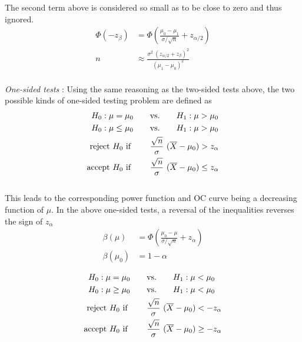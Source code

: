 The second term above is considered so small as to be close to zero and thus ignored.\\

\begin{align}
	\Phi(-z_\beta) &= \Phi\left(\frac{\mu_0 - \mu_1}{\sigma/\sqrt{n}} + z_{\alpha/2}\right) \nonumber \\
	n &\approx \frac{\sigma^2\ (z_{\alpha/2} + z_\beta)^2}{(\mu_1 - \mu_0)^2}
\end{align}\\

\textit{One-sided tests} : Using the same reasoning as the two-sided tests above, the two possible kinds of one-sided testing problem are defined as\\

\begin{align}
	H_0 : \mu = \mu_0 \qquad &\text{vs.} \qquad H_1 : \mu > \mu_0 \\
	H_0 : \mu \leq \mu_0 \qquad &\text{vs.} \qquad H_1 : \mu > \mu_0 \\
	\text{reject $ H_0 $ if } \qquad & \frac{\sqrt{n}}{\sigma}\ (\overline{X} - \mu_0)  > z_{\alpha} \\
	\text{accept $ H_0 $ if } \qquad & \frac{\sqrt{n}}{\sigma}\  (\overline{X} - \mu_0)  \leq z_{\alpha}
\end{align} \\

This leads to the corresponding power function and OC curve being a decreasing function of $ \mu $. In the above one-sided tests, a reversal of the inequalities reverses the sign of $ z_\alpha $\\

\begin{align}
	\beta(\mu) &= \Phi\left(\frac{\mu_0 - \mu}{\sigma/\sqrt{n}} + z_{\alpha}\right) \\
	\beta(\mu_0) &= 1 - \alpha
\end{align}

\begin{align}
	H_0 : \mu = \mu_0 \qquad &\text{vs.} \qquad H_1 : \mu < \mu_0 \\
	H_0 : \mu \geq \mu_0 \qquad &\text{vs.} \qquad H_1 : \mu < \mu_0 \\
	\text{reject $ H_0 $ if } \qquad & \frac{\sqrt{n}}{\sigma}\ (\overline{X} - \mu_0)  < -z_{\alpha} \\
	\text{accept $ H_0 $ if } \qquad & \frac{\sqrt{n}}{\sigma}\  (\overline{X} - \mu_0)  \geq -z_{\alpha}
\end{align} \\


\newpage

